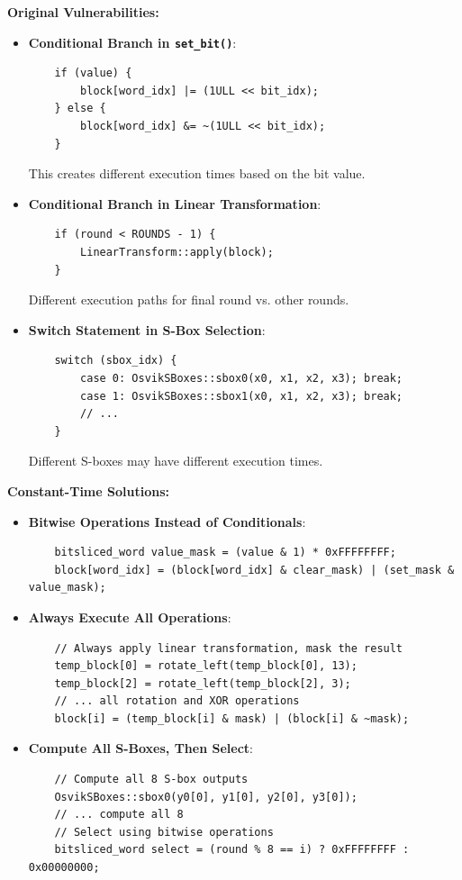 \documentclass[12pt,a4paper]{article}
\begin{document}
\textbf{Original Vulnerabilities:}
\begin{itemize}
    \item \textbf{Conditional Branch in \texttt{set\_bit()}}: 
    \begin{verbatim}
    if (value) {
        block[word_idx] |= (1ULL << bit_idx);
    } else {
        block[word_idx] &= ~(1ULL << bit_idx);
    }
    \end{verbatim}
    This creates different execution times based on the bit value.
    
    \item \textbf{Conditional Branch in Linear Transformation}:
    \begin{verbatim}
    if (round < ROUNDS - 1) {
        LinearTransform::apply(block);
    }
    \end{verbatim}
    Different execution paths for final round vs. other rounds.
    
    \item \textbf{Switch Statement in S-Box Selection}:
    \begin{verbatim}
    switch (sbox_idx) {
        case 0: OsvikSBoxes::sbox0(x0, x1, x2, x3); break;
        case 1: OsvikSBoxes::sbox1(x0, x1, x2, x3); break;
        // ...
    }
    \end{verbatim}
    Different S-boxes may have different execution times.
\end{itemize}

\textbf{Constant-Time Solutions:}
\begin{itemize}
    \item \textbf{Bitwise Operations Instead of Conditionals}:
    \begin{verbatim}
    bitsliced_word value_mask = (value & 1) * 0xFFFFFFFF;
    block[word_idx] = (block[word_idx] & clear_mask) | (set_mask & value_mask);
    \end{verbatim}
    
    \item \textbf{Always Execute All Operations}:
    \begin{verbatim}
    // Always apply linear transformation, mask the result
    temp_block[0] = rotate_left(temp_block[0], 13);
    temp_block[2] = rotate_left(temp_block[2], 3);
    // ... all rotation and XOR operations
    block[i] = (temp_block[i] & mask) | (block[i] & ~mask);
    \end{verbatim}
    
    \item \textbf{Compute All S-Boxes, Then Select}:
    \begin{verbatim}
    // Compute all 8 S-box outputs
    OsvikSBoxes::sbox0(y0[0], y1[0], y2[0], y3[0]);
    // ... compute all 8
    // Select using bitwise operations
    bitsliced_word select = (round % 8 == i) ? 0xFFFFFFFF : 0x00000000;
    \end{verbatim}
\end{itemize}
\end{document}
